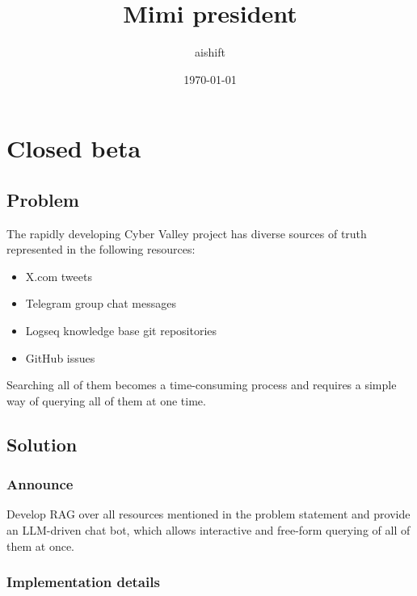 \documentclass[11pt]{article}
\author{aishift}
\date{\today}
\title{Mimi president}
\begin{document}
\maketitle
\tableofcontents

\section{Closed beta}
\label{sec:orgae7e1b9}
\subsection{Problem}
\label{sec:orge1438fd}

The rapidly developing Cyber Valley project has diverse sources of truth represented in the following resources:

\begin{itemize}
\item X.com tweets
\item Telegram group chat messages
\item Logseq knowledge base git repositories
\item GitHub issues
\end{itemize}

Searching all of them becomes a time-consuming process and requires a simple way of querying all of them at one time.
\subsection{Solution}
\label{sec:org342b027}

\subsubsection{Announce}
\label{sec:org277f696}

Develop RAG over all resources mentioned in the problem statement and provide an LLM-driven chat bot, which allows interactive and free-form querying of all of them at once.
\subsubsection{Implementation details}
\label{sec:org85e3245}
\end{document}
